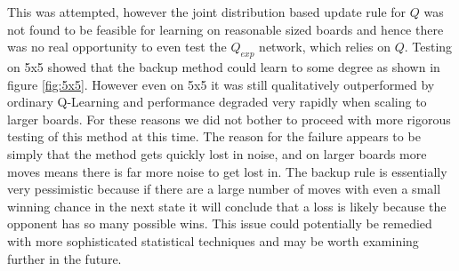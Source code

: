 \documentclass{article}
\begin{document}
This was attempted, however the joint distribution based update rule for $Q$ was not found to be feasible for learning on reasonable sized boards and hence there was no real opportunity to even test the $Q_{exp}$ network, which relies on $Q$.  Testing on 5x5 showed that the backup method could learn to some degree as shown in figure \ref{fig:5x5}. However even on 5x5 it was still qualitatively outperformed by ordinary Q-Learning and performance degraded very rapidly when scaling to larger boards. For these reasons we did not bother to proceed with more rigorous testing of this method at this time. The reason for the failure appears to be simply that the method gets quickly lost in noise, and on larger boards more moves means there is far more noise to get lost in. The backup rule is essentially very pessimistic because if there are a large number of moves with even a small winning chance in the next state it will conclude that a loss is likely because the opponent has so many possible wins. This issue could potentially be remedied with more sophisticated statistical techniques and may be worth examining further in the future.
\end{document}
